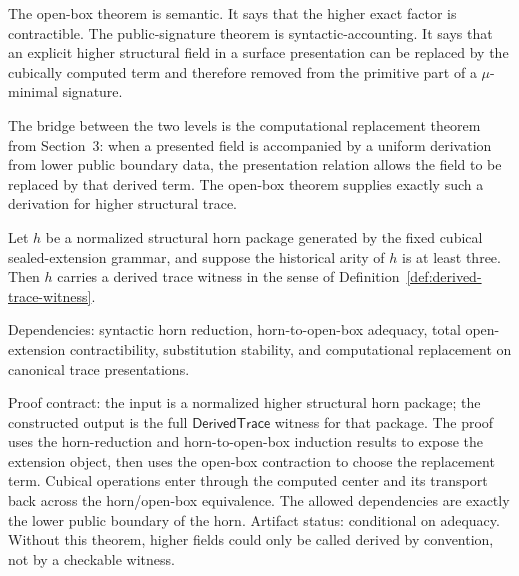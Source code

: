 \documentclass{lmcs}
\begin{document}
The open-box theorem is semantic.  It says that the higher exact factor is contractible.  The
public-signature theorem is syntactic-accounting.  It says that an explicit higher structural
field in a surface presentation can be replaced by the cubically computed term and therefore
removed from the primitive part of a \(\mu\)-minimal signature.

The bridge between the two levels is the computational replacement theorem from
Section~3: when a presented field is accompanied by a uniform derivation from lower public
boundary data, the presentation relation allows the field to be replaced by that derived term.
The open-box theorem supplies exactly such a derivation for higher structural trace.

\begin{thm}
\label{thm:higher-structural-derived-trace}
Let \(h\) be a normalized structural horn package generated by the fixed cubical
sealed-extension grammar, and suppose the historical arity of \(h\) is at least three.  Then
\(h\) carries a derived trace witness in the sense of
Definition~\ref{def:derived-trace-witness}.

Dependencies: syntactic horn reduction, horn-to-open-box adequacy, total open-extension
contractibility, substitution stability, and computational replacement on canonical trace
presentations.

Proof contract: the input is a normalized higher structural horn package; the
constructed output is the full \(\mathsf{DerivedTrace}\) witness for that
package.  The proof uses the horn-reduction and horn-to-open-box induction
results to expose the extension object, then uses the open-box contraction to
choose the replacement term.  Cubical operations enter through the computed
center and its transport back across the horn/open-box equivalence.  The
allowed dependencies are exactly the lower public boundary of the horn.
Artifact status: conditional on adequacy.  Without this theorem, higher fields
could only be called derived by convention, not by a checkable witness.
\end{thm}
\end{document}
